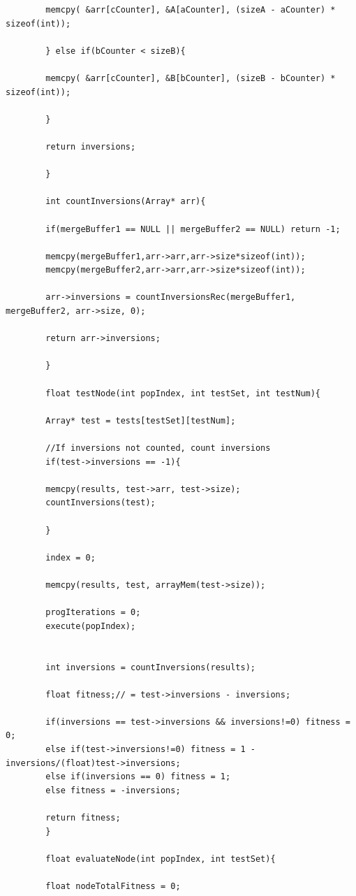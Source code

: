 \documentclass{article}
\begin{document}
\begin{lstlisting}
	    memcpy( &arr[cCounter], &A[aCounter], (sizeA - aCounter) * sizeof(int));
	    
	    } else if(bCounter < sizeB){
	    
	    memcpy( &arr[cCounter], &B[bCounter], (sizeB - bCounter) * sizeof(int));
	    
	    }    
	    
	    return inversions;
	    
	    }
	    
	    int countInversions(Array* arr){
	    
	    if(mergeBuffer1 == NULL || mergeBuffer2 == NULL) return -1;
	    
	    memcpy(mergeBuffer1,arr->arr,arr->size*sizeof(int));
	    memcpy(mergeBuffer2,arr->arr,arr->size*sizeof(int));
	    
	    arr->inversions = countInversionsRec(mergeBuffer1, mergeBuffer2, arr->size, 0);
	    
	    return arr->inversions;
	    
	    }
	    
	    float testNode(int popIndex, int testSet, int testNum){
	    
	    Array* test = tests[testSet][testNum];
	    
	    //If inversions not counted, count inversions
	    if(test->inversions == -1){
	    
	    memcpy(results, test->arr, test->size);
	    countInversions(test);
	    
	    }
	    
	    index = 0;
	    
	    memcpy(results, test, arrayMem(test->size));
	    
	    progIterations = 0;
	    execute(popIndex);
	    
	    
	    int inversions = countInversions(results);
	    
	    float fitness;// = test->inversions - inversions;
	    
	    if(inversions == test->inversions && inversions!=0) fitness = 0;
	    else if(test->inversions!=0) fitness = 1 - inversions/(float)test->inversions;
	    else if(inversions == 0) fitness = 1;
	    else fitness = -inversions;
	    
	    return fitness; 
	    }
	    
	    float evaluateNode(int popIndex, int testSet){
	    
	    float nodeTotalFitness = 0;
	    

\end{lstlisting}
\end{document}
